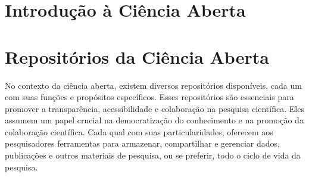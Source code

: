 \documentclass[
  a4paper,
]{article}
\begin{document}

\section{Introdução à Ciência Aberta}\label{sec-intro}


\section{Repositórios da Ciência Aberta}\label{sec-osf}

No contexto da ciência aberta, existem diversos repositórios
disponíveis, cada um com suas funções e propósitos específicos. Esses
repositórios são essenciais para promover a transparência,
acessibilidade e colaboração na pesquisa científica. Eles assumem um
papel crucial na democratização do conhecimento e na promoção da
colaboração científica. Cada qual com suas particularidades, oferecem
aos pesquisadores ferramentas para armazenar, compartilhar e gerenciar
dados, publicações e outros materiais de pesquisa, ou se preferir, todo
o ciclo de vida da pesquisa.
\end{document}
